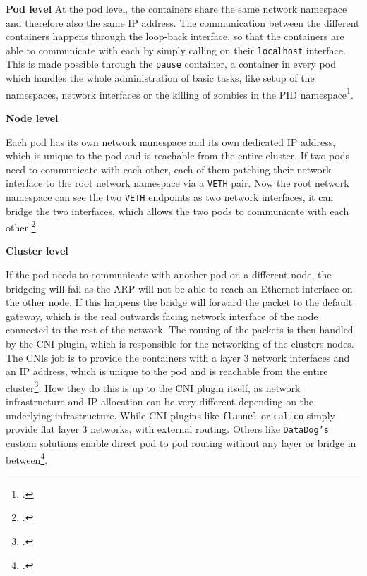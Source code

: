 \textbf{Pod level}
At the pod level, the containers share the same network namespace and therefore also the same \ac{IP} address.
The communication between the different containers happens through the loop-back interface,
so that the containers are able to communicate with each by simply calling on their \texttt{localhost} interface.
This is made possible through the \texttt{pause} container, a container in every pod which handles the whole administration
of basic tasks, like  setup  of the namespaces, network interfaces or the killing of \gls{zombies} in the \ac{PID} namespace\footcite{sookocheffGuideKubernetesNetworking2018}.

\textbf{Node level}

Each pod has its own network namespace and its own dedicated \ac{IP} address, which is unique to the pod and is reachable from the entire cluster.
If two pods need to communicate with each other,
each of them \gls{patching} their network interface to the root network namespace via a \texttt{\ac{VETH}} pair.
Now the root network namespace can see the two \texttt{\ac{VETH}} endpoints as two network interfaces,
it can \gls{bridge}  the two interfaces, which allows the two pods to communicate with each other \footcite{sookocheffGuideKubernetesNetworking2018}.


\textbf{Cluster level}

If the pod needs to communicate with another pod on a different node,
the \gls{bridge}ing will fail as the \ac{ARP} will not be able to reach an Ethernet interface on the other node.
If this happens the bridge will forward the packet to the default gateway,
which is the real outwards facing network interface of the node connected to the rest of the network.
The routing of the packets is then handled by the \ac{CNI} plugin, which is responsible for the networking of the clusters nodes.
The \ac{CNI}s job is to provide the containers with a layer 3 network interfaces and an \ac{IP} address,
which is unique to the pod and is reachable from the entire cluster\footcite{laurentbernailleKubeConCloudNativeConNorth2018}.
How they do this is up to the \ac{CNI} plugin itself, as network infrastructure and IP allocation can be very different depending on the underlying infrastructure.
While \ac{CNI} plugins like \texttt{flannel} or \texttt{calico} simply provide flat layer 3 networks,
with external routing. Others like \texttt{DataDog's} custom solutions enable direct pod to pod routing without any layer or bridge in between\footcite{laurentbernailleKubeConCloudNativeConNorth2018}.

